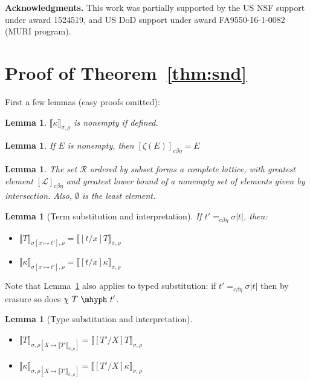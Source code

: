 \documentclass{article}
\newcommand{\choice}[0]{\zeta}
\newcommand{\interp}[1]{\llbracket #1 \rrbracket}
\newcommand{\cbe}[0]{c\beta\eta}
\newtheorem{lemma}[theorem]{Lemma}
\begin{document}
\textbf{Acknowledgments.}  This work was partially supported by the US
NSF support under award 1524519, and US DoD support under award
FA9550-16-1-0082 (MURI program).






\appendix

\section{Proof of Theorem~\ref{thm:snd}}

First a few lemmas (easy proofs omitted):

\begin{lemma}
  $\interp{\kappa}_{\sigma,\rho}$ is nonempty if defined.
\end{lemma}

\begin{lemma}
\label{lem:choice}
If $E$ is nonempty, then $[\choice(E)]_{\cbe} = E$
\end{lemma}

\begin{lemma}
  The set $\mathcal{R}$ ordered by subset forms a complete lattice,
  with greatest element $[\mathcal{L}]_{\cbe}$ and greatest lower bound
  of a nonempty set of elements given by
  intersection.  Also, $\emptyset$ is the least element.
\end{lemma}

\begin{lemma}[Term substitution and interpretation]
\label{lem:termsubstinterp}
If $t' =_{\cbe} \sigma |t|$, then: 
\begin{itemize}
\item $\interp{T}_{\sigma[x\mapsto t'],\rho} = \interp{[t/x]T}_{\sigma,\rho}$
\item $\interp{\kappa}_{\sigma[x\mapsto t'],\rho} = \interp{[t/x]\kappa}_{\sigma,\rho}$
\end{itemize}
\end{lemma}

Note that Lemma~\ref{lem:termsubstinterp} also applies to typed substitution: if
\(t' =_{\cbe} \sigma|t|\) then by erasure so does \(\chi\ T\ \mhyph\ t'\).

\begin{lemma}[Type substitution and interpretation] 
  \label{lem:tpsubstinterp}
  \ \\
  \begin{itemize}
  \item $\interp{T}_{\sigma,\rho[X\mapsto\interp{T'}_{\sigma,\rho}]} = \interp{[T'/X]T}_{\sigma,\rho}$
  \item $\interp{\kappa}_{\sigma,\rho[X\mapsto\interp{T'}_{\sigma,\rho}]} = \interp{[T'/X]\kappa}_{\sigma,\rho}$
  \end{itemize}
\end{lemma}
\end{document}

